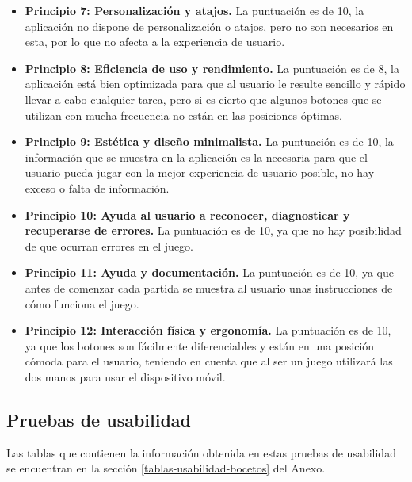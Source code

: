 \begin{itemize}
  \item \textbf{Principio 7: Personalización y atajos.}
  La puntuación es de 10, la aplicación no dispone de personalización o atajos, pero no son necesarios en esta, por lo que no afecta a la experiencia de usuario.

  \item \textbf{Principio 8: Eficiencia de uso y rendimiento.}
  La puntuación es de 8, la aplicación está bien optimizada para que al usuario le resulte sencillo y rápido llevar a cabo cualquier tarea, pero si es cierto que algunos botones que se utilizan con mucha frecuencia no están en las posiciones óptimas.

  \item \textbf{Principio 9: Estética y diseño minimalista.}
  La puntuación es de 10, la información que se muestra en la aplicación es la necesaria para que el usuario pueda jugar con la mejor experiencia de usuario posible, no hay exceso o falta de información.

  \item \textbf{Principio 10: Ayuda al usuario a reconocer, diagnosticar y recuperarse de errores.}
  La puntuación es de 10, ya que no hay posibilidad de que ocurran errores en el juego.

  \item \textbf{Principio 11: Ayuda y documentación.}
  La puntuación es de 10, ya que antes de comenzar cada partida se muestra al usuario unas instrucciones de cómo funciona el juego.

  \item \textbf{Principio 12: Interacción física y ergonomía.}
  La puntuación es de 10, ya que los botones son fácilmente diferenciables y están en una posición cómoda para el usuario, teniendo en cuenta que al ser un juego utilizará las dos manos para usar el dispositivo móvil.

\end{itemize}

\subsection{Pruebas de usabilidad}
Las tablas que contienen la información obtenida en estas pruebas de usabilidad se encuentran en la sección \ref{tablas-usabilidad-bocetos} del Anexo.

